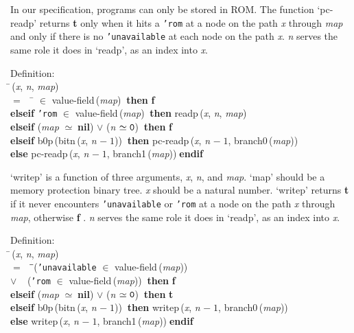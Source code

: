  In our specification, programs can only be stored in ROM.  The function
 `pc-readp' returns {\bf{t}} only when it hits a {\tt{'}}{\tt{rom}} at a node on the path {\it{x\/}}
 through {\it{map\/}} and only if there is no {\tt{'}}{\tt{unavailable}} at each node on the
 path {\it{x\/}}.  {\it{n\/}} serves the same role it does in `readp', as an index into
 {\it{x\/}}.
\begin{tabbing}{\sc Definition}: \\  
\=\,({\it{x\/}}, {\it{n\/}}, {\it{map\/}}) \\ 
$=$$\;\;\;\;$\= $\in$ {\rm{value-field}}\,({\it{map\/}})$\;\;${\bf then }{\bf{f}} \\ 
{\bf elseif }{\tt{'}}{\tt{rom}} $\in$ {\rm{value-field}}\,({\it{map\/}})$\;\;${\bf then }{\rm{readp}}\,({\it{x\/}}, {\it{n\/}}, {\it{map\/}}) \\ 
{\bf elseif }({\it{map\/}} $\simeq\;${{\bf{nil}}}${}$) $\vee$ ({\it{n\/}} $\simeq {\tt{0}}$)$\;\;${\bf then }{\bf{f}} \\ 
{\bf elseif }{\rm{b0p}}\,({\rm{bitn}}\,({\it{x\/}}, {\it{n\/}} $-\;1$))$\;\;${\bf then }{\rm{pc-readp}}\,({\it{x\/}}, {\it{n\/}} $-\;1$, {\rm{branch0}}\,({\it{map\/}})) \\ 
{\bf else }{\rm{pc-readp}}\,({\it{x\/}}, {\it{n\/}} $-\;1$, {\rm{branch1}}\,({\it{map\/}}))$\;${\bf  endif}\-\-
\end{tabbing}

 `writep' is a function of three arguments, {\it{x\/}}, {\it{n\/}}, and {\it{map\/}}.  `map'
 should be a memory protection binary tree.  {\it{x\/}} should be a natural number.
 `writep' returns {\bf{t}} if it never encounters {\tt{'}}{\tt{unavailable}} or {\tt{'}}{\tt{rom}} at a
 node on the path {\it{x\/}} through {\it{map\/}}, otherwise {\bf{f}} .  {\it{n\/}} serves the same role
 it does in `readp', as an index into {\it{x\/}}.
\begin{tabbing}{\sc Definition}: \\  
\=\,({\it{x\/}}, {\it{n\/}}, {\it{map\/}}) \\ 
$=$$\;\;\;\;$\=\=\+({\tt{'}}{\tt{unavailable}} $\in$ {\rm{value-field}}\,({\it{map\/}})) \\ 
$\vee$$\;\;\;\;$({\tt{'}}{\tt{rom}} $\in$ {\rm{value-field}}\,({\it{map\/}}))\-$\;\;${\bf then }{\bf{f}} \\ 
{\bf elseif }({\it{map\/}} $\simeq\;${{\bf{nil}}}${}$) $\vee$ ({\it{n\/}} $\simeq {\tt{0}}$)$\;\;${\bf then }{\bf{t}} \\ 
{\bf elseif }{\rm{b0p}}\,({\rm{bitn}}\,({\it{x\/}}, {\it{n\/}} $-\;1$))$\;\;${\bf then }{\rm{writep}}\,({\it{x\/}}, {\it{n\/}} $-\;1$, {\rm{branch0}}\,({\it{map\/}})) \\ 
{\bf else }{\rm{writep}}\,({\it{x\/}}, {\it{n\/}} $-\;1$, {\rm{branch1}}\,({\it{map\/}}))$\;${\bf  endif}\-\-
\end{tabbing}

